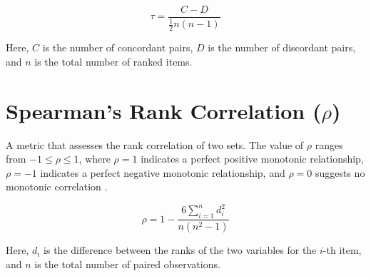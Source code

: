 \begin{equation}
  \tau = \frac{C - D}{\frac{1}{2} n (n - 1)}
\end{equation}

Here, $C$ is the number of concordant pairs, $D$ is the number of discordant pairs, and $n$ is the total number of ranked items.


\section*{Spearman's Rank Correlation ($\rho$)}\label{sec:spearman-rho}
A metric that assesses the rank correlation of two sets. The value of $\rho$ ranges from $-1 \leq \rho \leq 1$, where $\rho = 1$ indicates a perfect positive monotonic relationship, $\rho = -1$ indicates a perfect negative monotonic relationship, and $\rho = 0$ suggests no monotonic correlation \cite{spearman1904}.

\begin{equation}
  \rho = 1 - \frac{6 \sum_{i=1}^{n} d_i^2}{n(n^2 - 1)}
\end{equation}

Here, $d_i$ is the difference between the ranks of the two variables for the $i$-th item, and $n$ is the total number of paired observations.

